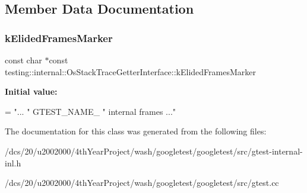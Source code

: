 \subsection{Member Data Documentation}
\mbox{\label{classtesting_1_1internal_1_1OsStackTraceGetterInterface_a669c49ce9ae05935e70bddb35a81ceb8}} 
\subsubsection{\texorpdfstring{k\+Elided\+Frames\+Marker}{kElidedFramesMarker}}
{\footnotesize\ttfamily const char $\ast$const testing\+::internal\+::\+Os\+Stack\+Trace\+Getter\+Interface\+::k\+Elided\+Frames\+Marker\hspace{0.3cm}{\ttfamily [static]}}

{\bfseries Initial value\+:}
\begin{DoxyCode}
=
    \textcolor{stringliteral}{"... "} GTEST\_NAME\_ \textcolor{stringliteral}{" internal frames ..."}
\end{DoxyCode}


The documentation for this class was generated from the following files\+:\begin{DoxyCompactItemize}
\item 
/dcs/20/u2002000/4th\+Year\+Project/wash/googletest/googletest/src/gtest-\/internal-\/inl.\+h\item 
/dcs/20/u2002000/4th\+Year\+Project/wash/googletest/googletest/src/gtest.\+cc\end{DoxyCompactItemize}
